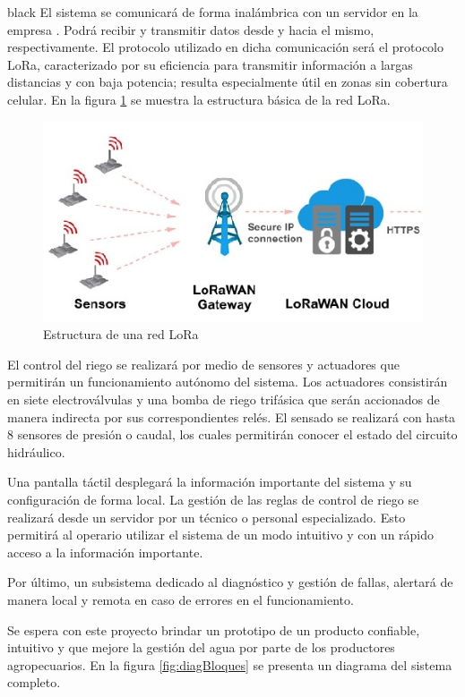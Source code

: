 \documentclass[11pt]{charter}
\begin{document}
\begin{consigna}{black}
El sistema se comunicará de forma inalámbrica con un servidor en la empresa \empclientename . Podrá recibir  y transmitir datos desde y hacia el mismo, respectivamente. El protocolo utilizado en dicha comunicación será el protocolo LoRa, caracterizado por su eficiencia para transmitir información a largas distancias y con baja potencia; resulta especialmente útil en zonas sin cobertura celular. En la figura \ref{fig:redLoRa} se muestra la estructura básica de la red LoRa.

\begin{figure}[htpb]
\centering 
\includegraphics[width=.7\textwidth]{./Figuras/redLora.png}
\caption{Estructura de una red LoRa}
\label{fig:redLoRa}
\end{figure}

El control del riego se realizará por medio de sensores y actuadores que permitirán un funcionamiento autónomo del sistema. Los actuadores consistirán en siete electroválvulas y una bomba de riego trifásica que serán accionados de manera indirecta por sus correspondientes relés. El sensado se realizará con hasta 8 sensores de presión o caudal, los cuales permitirán conocer el estado del circuito hidráulico.

Una pantalla táctil desplegará la información importante del sistema y su configuración de forma local. La gestión de las reglas de control de riego se realizará desde un servidor por un técnico o personal especializado. Esto permitirá al operario utilizar el sistema de un modo intuitivo y con un rápido acceso a la información importante.

Por último, un subsistema dedicado al diagnóstico y gestión de fallas, alertará de manera local y remota en caso de errores en el funcionamiento.

Se espera con este proyecto brindar un prototipo de un producto confiable, intuitivo y que mejore la gestión del agua por parte de los productores agropecuarios. En la figura \ref{fig:diagBloques} se presenta un diagrama del sistema completo.



\end{consigna}
\end{document}
